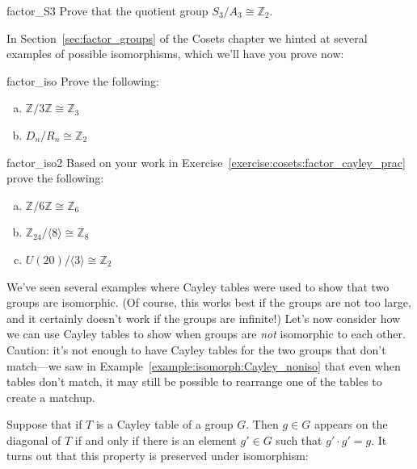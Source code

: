 
\begin{exercise}{factor_S3}
Prove that the quotient group $S_3/A_3 \cong {\mathbb Z}_2$.
\end{exercise}

In Section~\ref{sec:factor_groups} of the Cosets chapter we hinted at several examples of possible isomorphisms,  which we'll have you prove now:

\begin{exercise}{factor_iso}
Prove the following:
\begin{enumerate}[(a)]
\item
 ${\mathbb Z}/ 3 {\mathbb Z} \cong {\mathbb Z}_3$
\item
$D_n / R_n \cong {\mathbb Z}_2$
\end{enumerate}
\end{exercise}

\begin{exercise}{factor_iso2}
Based on your work in Exercise~\ref{exercise:cosets:factor_cayley_prac} prove the following:
\begin{enumerate}[(a)]
\item
 ${\mathbb Z}/ 6 {\mathbb Z} \cong {\mathbb Z}_6 $

\item
 ${\mathbb Z}_{24} / \langle 8 \rangle \cong {\mathbb Z}_8 $ 

\item
$U(20) / \langle 3 \rangle \cong  {\mathbb Z}_2 $

\end{enumerate}
\end{exercise}

We've seen several examples where  Cayley tables were used to show that two groups are isomorphic. (Of course, this works best if the groups are not too large, and it certainly doesn't work if the groups are infinite!)  Let's now consider how we can use Cayley tables to show when groups are \emph{not} isomorphic to each other. Caution: it's not enough to have Cayley tables for the two groups that don't match---we saw in Example~\ref{example:isomorph:Cayley_noniso} that even when tables don't match, it may still be possible to rearrange one of the tables to create a matchup.

Suppose  that if $T$ is a Cayley table of a group $G$. Then $g \in G$  appears on the diagonal of $T$ if and only if there is an element $g' \in G$ such that $g' \cdot g' = g$.  It turns out that this property is preserved under isomorphism:

